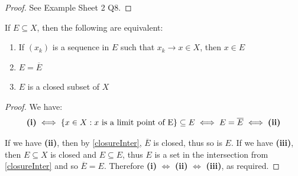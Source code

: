 \documentclass[../main.tex]{subfiles}
\begin{document}
\begin{proof}
  See Example Sheet 2 Q8.
\end{proof}
\begin{proposition}
  If $E \subseteq X$, then the following are equivalent: \label{closedEquiv}
  \begin{enumerate}
    \item If $(x_k)$ is a sequence in $E$ such that $x_k \to x \in X$, then $x \in E$
    \item $E = \overline{E}$
    \item $E$ is a closed subset of $X$
  \end{enumerate}
\end{proposition}
\begin{proof}
  We have:
  \[
    \text{\textbf{(i)}} \iff \{x \in X: x \text{ is a limit point of E}\} \subseteq E \iff E = \overline{E} \iff \text{\textbf{(ii)}}
  \]

  If we have \textbf{(ii)}, then by \cref{closureInter}, $\overline{E}$ is closed, thus so is $E$.
  If we have \textbf{(iii)}, then $E \subseteq X$ is closed and $E \subseteq E$, thus $E$ is a set in the intersection from \cref{closureInter} and so $\overline{E} = E$.
  Therefore \textbf{(i)} $\iff$ \textbf{(ii)} $\iff$ \textbf{(iii)}, as required.
\end{proof}
\end{document}
